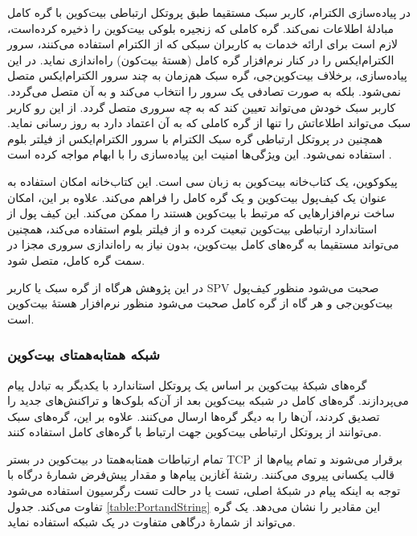 در پیاده‌سازی الکترام،‌ کاربر سبک مستقیما طبق پروتکل ارتباطی بیت‌کوین با گره کامل مبادلهٔ اطلاعات نمی‌کند. گره کاملی که زنجیره بلوکی بیت‌کوین را ذخیره کرده‌است،‌ لازم است برای ارائه خدمات به کاربران سبکی که از الکترام استفاده می‌کنند،‌ سرور 
الکترام‌ایکس
\cite{ElectrumX}
را در کنار نرم‌افزار گره کامل (هسته‌ٔ بیت‌کون) راه‌اندازی نماید. در این پیاده‌سازی، برخلاف بیت‌کوین‌جی، گره سبک هم‌زمان به چند سرور الکترام‌ایکس متصل نمی‌شود. بلکه به صورت تصادفی یک سرور را انتخاب می‌کند و به آن متصل می‌گردد. کاربر سبک خودش می‌تواند تعیین کند که به چه سروری متصل گردد. از این رو کاربر سبک می‌تواند اطلاعاتش را تنها از گره کاملی که به آن اعتماد دارد به روز رسانی نماید.  همچنین در پروتکل ارتباطی گره سبک الکترام با سرور الکترام‌ایکس از فیلتر بلوم استفاده نمی‌شود. این ویژگی‌ها امنیت این پیاده‌سازی را با ابهام مواجه کرده است \cite{Alison2014}. 

پیکوکوین،‌ یک کتاب‌خانه بیت‌کوین به زبان سی است. این کتاب‌خانه امکان استفاده به عنوان یک کیف‌پول بیت‌کوین و یک گره کامل را فراهم می‌کند. علاوه بر این، امکان ساخت نرم‌افزارهایی که مرتبط با بیت‌کوین هستند را ممکن می‌کند. این کیف پول از استاندارد ارتباطی بیت‌کوین تبعیت کرده و از فیلتر بلوم استفاده می‌کند، همچنین می‌تواند مستقیما به گره‌های کامل بیت‌کوین، بدون نیاز به راه‌اندازی سروری مجزا در سمت گره کامل، متصل شود.

در این پژوهش هرگاه از گره سبک یا کاربر SPV صحبت می‌شود منظور کیف‌پول بیت‌کوین‌جی \cite{bitcoinj} و هر گاه از گره کامل صحبت می‌شود منظور نرم‌افزار
هستهٔ بیت‌کوین 
\cite{Bitcoincore.org}
است.


\subsubsection{شبکه همتا‌به‌همتای بیت‌کوین}
\label{P2PNetwork}

گره‌های شبکهٔ بیت‌کوین بر اساس یک پروتکل استاندارد با یکدیگر به تبادل پیام می‌پردازند. گره‌های کامل در شبکه بیت‌کوین بعد از آن‌که بلوک‌ها و تراکنش‌های جدید را تصدیق کردند، آن‌ها را به دیگر گره‌ها ارسال می‌کنند. علاوه بر این، گره‌های سبک می‌توانند از پروتکل ارتباطی بیت‌کوین جهت ارتباط با گره‌های کامل استفاده کنند.

تمام  ارتباطات همتا‌به‌همتا در بیت‌کوین در بستر TCP برقرار می‌شوند و تمام پیام‌ها از قالب یکسانی پیروی می‌کنند. رشتهٔ آغازین پیام‌ها و مقدار پیش‌فرض شمارهٔ درگاه با توجه به اینکه پیام در شبکهٔ اصلی، تست یا در حالت تست رگرسیون استفاده می‌شود تفاوت می‌کند. جدول \ref{table:PortandString} این مقادیر را نشان می‌دهد. یک گره می‌تواند از شمارهٔ درگاهی متفاوت در یک شبکه استفاده نماید.



